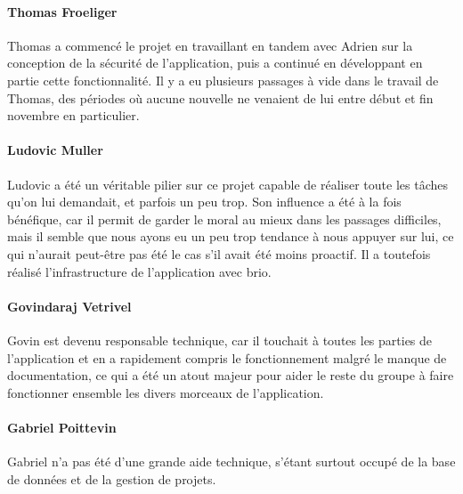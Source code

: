 \paragraph{Thomas Froeliger} Thomas a commencé le projet en travaillant en
tandem avec Adrien sur la conception de la sécurité de l'application, puis
a continué en développant en partie cette fonctionnalité. Il y a eu plusieurs
passages à vide dans le travail de Thomas, des périodes où aucune nouvelle
ne venaient de lui entre début et fin novembre en particulier.

\paragraph{Ludovic Muller} Ludovic a été un véritable pilier sur ce projet
capable de réaliser toute les tâches qu'on lui demandait, et parfois un peu
trop. Son influence a été à la fois bénéfique, car il permit de garder le
moral au mieux dans les passages difficiles, mais il semble que nous ayons
eu un peu trop tendance à nous appuyer sur lui, ce qui n'aurait peut-être pas
été le cas s'il avait été moins proactif. Il a toutefois réalisé
l'infrastructure de l'application avec brio.

\paragraph{Govindaraj Vetrivel} Govin est devenu responsable technique, car
il touchait à toutes les parties de l'application et en a rapidement compris
le fonctionnement malgré le manque de documentation, ce qui a été un atout
majeur pour aider le reste du groupe à faire fonctionner ensemble les divers
morceaux de l'application.

\paragraph{Gabriel Poittevin} Gabriel n'a pas été d'une grande aide technique,
s'étant surtout occupé de la base de données et de la gestion de projets.

